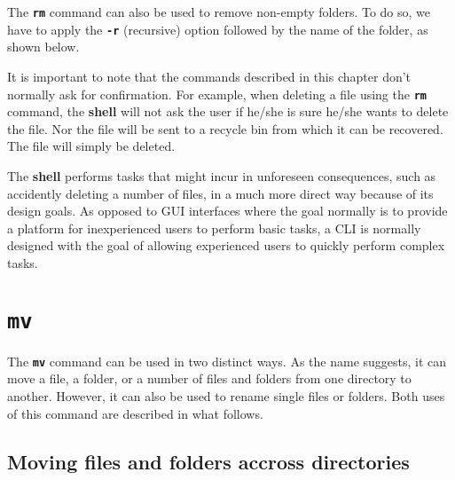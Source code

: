 The \textbf{\texttt{rm}} command can also be used to remove non-empty folders. To do so, we have to apply the \textbf{\texttt{-r}} (recursive) option followed by the name of the folder, as shown below.


\begin{my_box}
  It is important to note that the commands described in this chapter don't normally ask for confirmation. For example, when deleting a file using the \textbf{\texttt{rm}} command, the \textbf{shell} will not ask the user if he/she is sure he/she wants to delete the file. Nor the file will be sent to a recycle bin from which it can be recovered. The file will simply be deleted.

  The \textbf{shell} performs tasks that might incur in unforeseen consequences, such as accidently deleting a number of files, in a much more direct way because of its design goals. As opposed to \acs{GUI} interfaces where the goal normally is to provide a platform for inexperienced users to perform basic tasks, a \acs{CLI} is normally designed with the goal of allowing experienced users to quickly perform complex tasks.
\end{my_box}

\section{\textbf{\texttt{mv}}}

The \textbf{\texttt{mv}} command can be used in two distinct ways. As the name suggests, it can move a file, a folder, or a number of files and folders from one directory to another. However, it can also be used to rename single files or folders. Both uses of this command are described in what follows.

\subsection{Moving files and folders accross directories}

